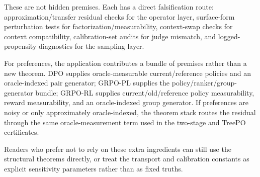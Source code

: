 These are not hidden premises. Each has a direct falsification route: approximation/transfer residual checks for the operator layer, surface-form perturbation tests for factorization/measurability, context-swap checks for context compatibility, calibration-set audits for judge mismatch, and logged-propensity diagnostics for the sampling layer.

For preferences, the application contributes a bundle of premises rather
than a new theorem. DPO supplies oracle-measurable current/reference
policies and an oracle-indexed pair generator; GRPO-PL supplies the
policy/ranker/group-generator bundle; GRPO-RL supplies current/old/reference
policy measurability, reward measurability, and an oracle-indexed group
generator. If preferences are noisy or only approximately oracle-indexed,
the theorem stack routes the residual through the same oracle-measurement
term used in the two-stage and TreePO certificates.

Readers who prefer not to rely on these extra ingredients can still use the structural theorems directly, or treat the transport and calibration constants as explicit sensitivity parameters rather than as fixed truths.
